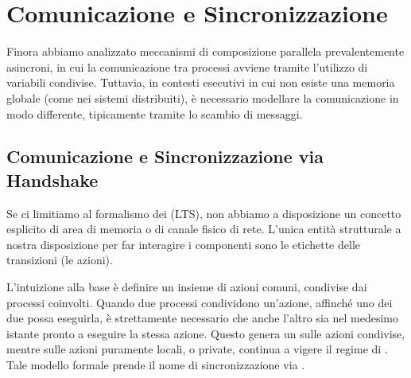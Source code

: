\section{Comunicazione e Sincronizzazione}

Finora abbiamo analizzato meccanismi di composizione parallela prevalentemente asincroni, in cui la comunicazione tra processi avviene tramite l'utilizzo di variabili condivise. Tuttavia, in contesti esecutivi in cui non esiste una memoria globale (come nei sistemi distribuiti), è necessario modellare la comunicazione in modo differente, tipicamente tramite lo scambio di messaggi.

\subsection{Comunicazione e Sincronizzazione via Handshake}

Se ci limitiamo al formalismo dei  (LTS), non abbiamo a disposizione un concetto esplicito di area di memoria o di canale fisico di rete. L'unica entità strutturale a nostra disposizione per far interagire i componenti sono le etichette delle transizioni (le azioni).

L'intuizione alla base è definire un insieme di azioni comuni, condivise dai processi coinvolti. Quando due processi condividono un'azione, affinché uno dei due possa eseguirla, è strettamente necessario che anche l'altro sia nel medesimo istante pronto a eseguire la stessa azione. Questo genera un  sulle azioni condivise, mentre sulle azioni puramente locali, o private, continua a vigere il regime di . Tale modello formale prende il nome di sincronizzazione via .

